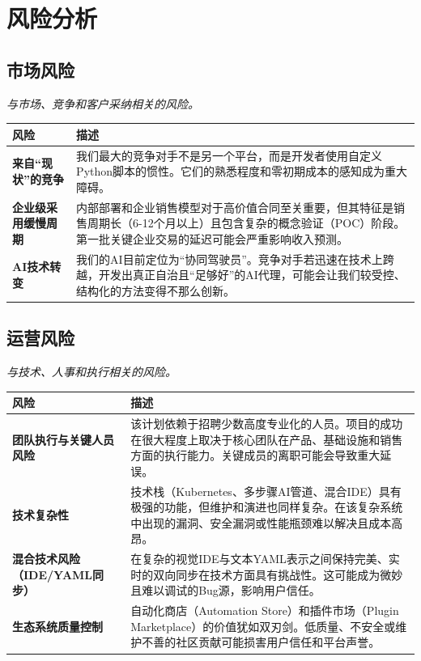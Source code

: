 \documentclass[11点, A4纸, 单面]{article}
\begin{document}
\newpage
\section{风险分析}
\subsection{市场风险}
\textit{与市场、竞争和客户采纳相关的风险。}

\begin{table}[H]
\centering
\begin{tabularx}{\textwidth}{@{}lL@{}}
\toprule
\textbf{风险} & \textbf{描述} \\
\midrule
\textbf{来自“现状”的竞争} & 我们最大的竞争对手不是另一个平台，而是开发者使用自定义Python脚本的惯性。它们的熟悉程度和零初期成本的感知成为重大障碍。 \\
\addlinespace
\textbf{企业级采用缓慢周期} & 内部部署和企业销售模型对于高价值合同至关重要，但其特征是销售周期长（6-12个月以上）且包含复杂的概念验证（POC）阶段。第一批关键企业交易的延迟可能会严重影响收入预测。 \\
\addlinespace
\textbf{AI技术转变} & 我们的AI目前定位为“协同驾驶员”。竞争对手若迅速在技术上跨越，开发出真正自治且“足够好”的AI代理，可能会让我们较受控、结构化的方法变得不那么创新。 \\
\bottomrule
\end{tabularx}
\end{table}

\newpage
\subsection{运营风险}
\textit{与技术、人事和执行相关的风险。}

\begin{table}[H]
\centering
\begin{tabularx}{\textwidth}{@{}lL@{}}
\toprule
\textbf{风险} & \textbf{描述} \\



\midrule
\textbf{团队执行与关键人员风险} & 该计划依赖于招聘少数高度专业化的人员。项目的成功在很大程度上取决于核心团队在产品、基础设施和销售方面的执行能力。关键成员的离职可能会导致重大延误。 \\
\addlinespace
\textbf{技术复杂性} & 技术栈（Kubernetes、多步骤AI管道、混合IDE）具有极强的功能，但维护和演进也同样复杂。在该复杂系统中出现的漏洞、安全漏洞或性能瓶颈难以解决且成本高昂。 \\
\addlinespace
\textbf{混合技术风险（IDE/YAML同步）} & 在复杂的视觉IDE与文本YAML表示之间保持完美、实时的双向同步在技术方面具有挑战性。这可能成为微妙且难以调试的Bug源，影响用户信任。 \\
\addlinespace
\textbf{生态系统质量控制} & 自动化商店（Automation Store）和插件市场（Plugin Marketplace）的价值犹如双刃剑。低质量、不安全或维护不善的社区贡献可能损害用户信任和平台声誉。 \\
\bottomrule
\end{tabularx}
\end{table}
\end{document}
